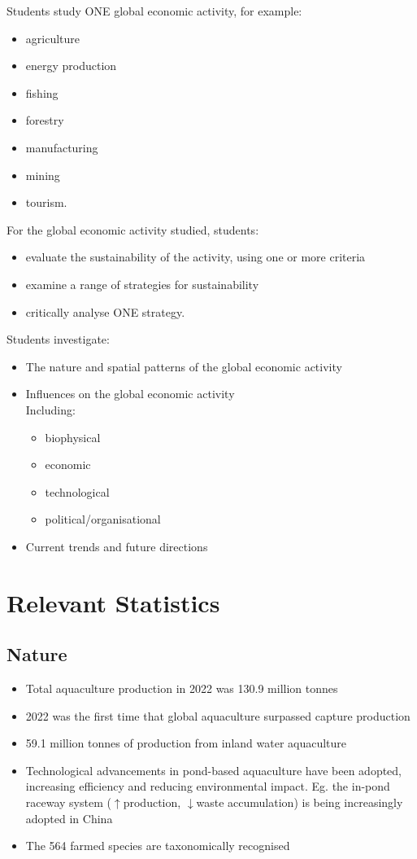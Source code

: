 	Students study ONE global economic activity, for example:
	\begin{itemize}
		\item agriculture
		\item energy production
		\item fishing
		\item forestry
		\item manufacturing
		\item mining
		\item tourism.
	\end{itemize}

	For the global economic activity studied, students:
	\begin{itemize}
		\item evaluate the sustainability of the activity, using one or more criteria
		\item examine a range of strategies for sustainability
		\item critically analyse ONE strategy.
	\end{itemize}
	Students investigate:
	\begin{itemize}
		\item The nature and spatial patterns of the global economic activity
		\item Influences on the global economic activity \\ Including:
		\begin{itemize}
			\item biophysical
			\item economic
			\item technological
			\item political/organisational
		\end{itemize}
		\item Current trends and future directions
	\end{itemize}

\section{Relevant Statistics}
	\subsection{Nature}
		\begin{itemize}
			\item Total aquaculture production in 2022 was 130.9 million tonnes
			\item 2022 was the first time that global aquaculture surpassed capture production
			\item 59.1 million tonnes of production from inland water aquaculture
			\item Technological advancements in pond-based aquaculture have been adopted, increasing efficiency and reducing environmental impact. Eg. the in-pond raceway system ($\uparrow$production, $\downarrow$waste accumulation) is being increasingly adopted in China
			\item The 564 farmed species are taxonomically recognised 
		\end{itemize}
		
